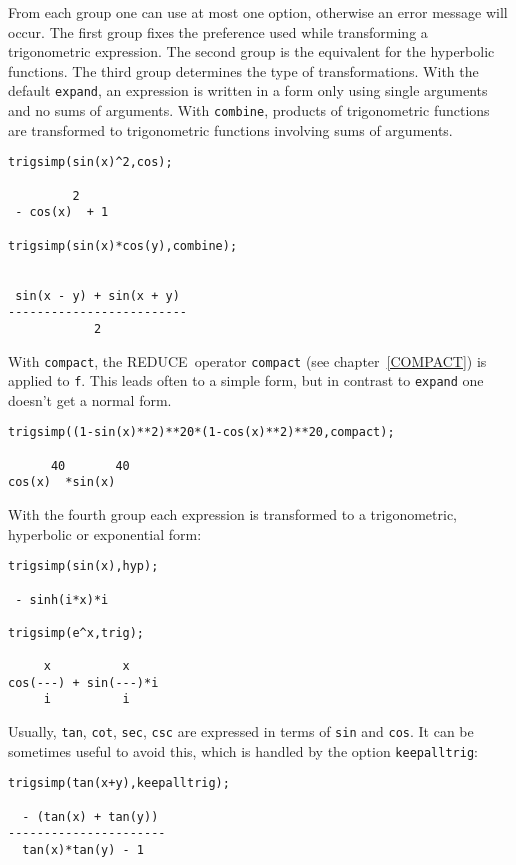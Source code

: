 \documentclass[11pt,letterpaper]{book}
\newcommand{\REDUCE}{REDUCE}
\begin{document}
From each group one can use at most one option, otherwise an error
message will occur. The first group fixes the preference used while
transforming a trigonometric expression.
The second group is the equivalent for the hyperbolic functions.
The third group determines the type of transformations. With
the default {\tt expand}, an expression is written in a form only using
single arguments and no sums of arguments.  With {\tt combine},
products of trigonometric functions are transformed to trigonometric
functions involving sums of arguments.


{\small\begin{verbatim}
trigsimp(sin(x)^2,cos);

         2
 - cos(x)  + 1

trigsimp(sin(x)*cos(y),combine);


 sin(x - y) + sin(x + y)
-------------------------
            2
\end{verbatim}}

With {\tt compact}, the \REDUCE\ operator {\tt compact} (see
chapter~\ref{COMPACT}) is applied to {\tt f}.
This leads often to a simple form, but in contrast to {\tt expand} one
doesn't get a normal form.

{\small\begin{verbatim}
trigsimp((1-sin(x)**2)**20*(1-cos(x)**2)**20,compact);

      40       40
cos(x)  *sin(x)
\end{verbatim}}

With the fourth group each expression is transformed to a
trigonometric, hyperbolic or exponential form:

{\small\begin{verbatim}
trigsimp(sin(x),hyp);

 - sinh(i*x)*i

trigsimp(e^x,trig);

     x          x
cos(---) + sin(---)*i
     i          i
\end{verbatim}}


Usually, {\tt tan}, {\tt cot}, {\tt sec}, {\tt csc} are expressed in terms of
{\tt sin} and {\tt cos}.  It can
be sometimes useful to avoid this, which is handled by the option
{\tt keepalltrig}:

{\small\begin{verbatim}
trigsimp(tan(x+y),keepalltrig);

  - (tan(x) + tan(y))
----------------------
  tan(x)*tan(y) - 1
\end{verbatim}}
\end{document}
